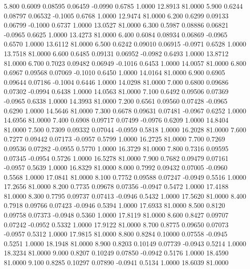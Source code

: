    5.800   0.6009   0.08595   0.06459  -0.0990   0.6785   1.0000  12.8913  81.0000
   5.900   0.6244   0.08797   0.06532  -0.1005   0.6768   1.0000  12.9474  81.0000
   6.200   0.6299   0.09133   0.06799  -0.1000   0.6737   1.0000  13.0527  81.0000
   6.300   0.5987   0.08886   0.06821  -0.0965   0.6625   1.0000  13.4273  81.0000
   6.400   0.6084   0.08934   0.06869  -0.0965   0.6570   1.0000  13.6112  81.0000
   6.500   0.6242   0.09010   0.06915  -0.0971   0.6528   1.0000  13.7518  81.0000
   6.600   0.6485   0.09131   0.06952  -0.0982   0.6493   1.0000  13.8712  81.0000
   6.700   0.7023   0.09482   0.06949  -0.1016   0.6453   1.0000  14.0057  81.0000
   6.800   0.6967   0.09568   0.07069  -0.1010   0.6450   1.0000  14.0164  81.0000
   6.900   0.6905   0.09644   0.07186  -0.1004   0.6446   1.0000  14.0298  81.0000
   7.000   0.6800   0.09686   0.07302  -0.0994   0.6438   1.0000  14.0563  81.0000
   7.100   0.6492   0.09506   0.07369  -0.0965   0.6338   1.0000  14.3993  81.0000
   7.200   0.6561   0.09560   0.07428  -0.0965   0.6290   1.0000  14.5646  81.0000
   7.300   0.6678   0.09631   0.07481  -0.0967   0.6252   1.0000  14.6956  81.0000
   7.400   0.6908   0.09717   0.07499  -0.0976   0.6209   1.0000  14.8404  81.0000
   7.500   0.7309   0.09332   0.07044  -0.0959   0.5818   1.0000  16.2028  81.0000
   7.600   0.7277   0.09442   0.07173  -0.0957   0.5799   1.0000  16.2725  81.0000
   7.700   0.7269   0.09536   0.07282  -0.0955   0.5770   1.0000  16.3729  81.0000
   7.800   0.7316   0.09595   0.07345  -0.0954   0.5726   1.0000  16.5278  81.0000
   7.900   0.7682   0.09479   0.07161  -0.0957   0.5639   1.0000  16.8329  81.0000
   8.000   0.7992   0.09432   0.07005  -0.0960   0.5568   1.0000  17.0841  81.0000
   8.100   0.7752   0.09588   0.07247  -0.0949   0.5516   1.0000  17.2656  81.0000
   8.200   0.7735   0.09678   0.07356  -0.0947   0.5472   1.0000  17.4188  81.0000
   8.300   0.7795   0.09737   0.07413  -0.0946   0.5432   1.0000  17.5620  81.0000
   8.400   0.7918   0.09766   0.07423  -0.0946   0.5394   1.0000  17.6933  81.0000
   8.500   0.8120   0.09758   0.07373  -0.0948   0.5360   1.0000  17.8119  81.0000
   8.600   0.8427   0.09707   0.07242  -0.0952   0.5332   1.0000  17.9122  81.0000
   8.700   0.8775   0.09650   0.07073  -0.0957   0.5312   1.0000  17.9815  81.0000
   8.800   0.8284   0.10000   0.07558  -0.0945   0.5251   1.0000  18.1948  81.0000
   8.900   0.8203   0.10149   0.07739  -0.0943   0.5214   1.0000  18.3234  81.0000
   9.000   0.8207   0.10249   0.07850  -0.0942   0.5176   1.0000  18.4590  81.0000
   9.100   0.8285   0.10297   0.07890  -0.0941   0.5134   1.0000  18.6039  81.0000
